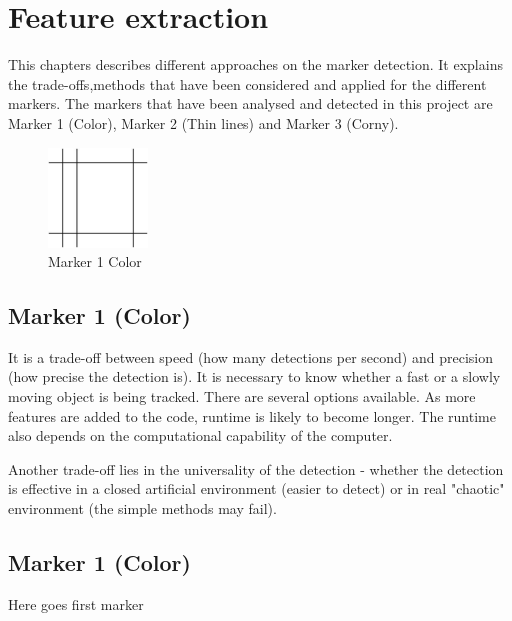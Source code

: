 \chapter{Feature extraction} %
\label{chap:feature_extraction}
This chapters describes different approaches on the marker detection. It explains the trade-offs,methods that have been considered and applied for the different markers. The markers that have been analysed and detected in this project are Marker 1 (Color), Marker 2 (Thin lines) and Marker 3 (Corny). 


\begin{figure}[ht!]
	\centering
	\includegraphics[width=100px]{figures/Marker2a}
	\caption{Marker 1 Color}
	\label{fig:markerColor}
\end{figure}


\section{Marker 1 (Color)} 
It is a trade-off between speed (how many detections per second) and precision (how precise the detection is). It is necessary to know whether a fast or a slowly moving object is being tracked. There are several options available. As more features are added to the code, runtime is likely to become longer. The runtime also depends on the computational capability of the computer.

Another trade-off lies in the universality of the detection - whether the detection is effective in a closed artificial environment (easier to detect) or in real "chaotic" environment (the simple methods may fail).

\newpage


\section{Marker 1 (Color)} 
Here goes first marker



